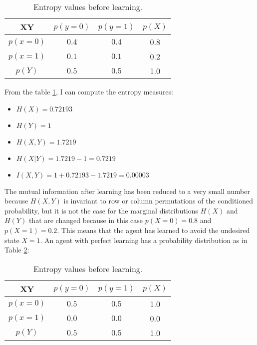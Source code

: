 \begin{table}[htbp]
\caption{
Entropy values before learning. \label{table:afterlearning}}
\begin{center}
\begin{tabular}{@{}c|ccc@{}}
\hline
  XY	   & $p(y=0)$ & $p(y=1)$ & $p(X)$\\
\hline
  $p(x=0)$ & $0.4$    & $0.4$    & 0.8\\
  $p(x=1)$ & $0.1$    & $0.1$    & 0.2\\
\hline
  $p(Y)$   & $0.5$    & $0.5$    & 1.0\\
\hline
\end{tabular}
\end{center}
\end{table}

From the table \ref{table:afterlearning}, I can compute the entropy measures:
\begin{itemize}
 \item $H(X)=0.72193$
 \item $H(Y)=1$
 \item $H(X,Y)=1.7219$
 \item $H(X|Y)=1.7219-1=0.7219$
 \item $I(X,Y)=1+0.72193-1.7219=0.00003$
\end{itemize}
The mutual information after learning has been reduced to a very small number because 
$H(X,Y)$ is invariant to row or column permutations of the conditioned probability, 
but it is not the case for the marginal distributions $H(X)$ and $H(Y)$ that are 
changed because in this case $p(X=0)=0.8$ and $p(X=1)=0.2$. This means that the 
agent has learned to avoid the undesired state $X=1$.
An agent with perfect learning has a probability distribution as in Table \ref{table:perfect}:
\begin{table}[htbp]
\caption{
Entropy values before learning.\label{table:perfect}}
\begin{center}
\begin{tabular}{|c| c| c| c|}
\hline
  XY	   & $p(y=0)$ & $p(y=1)$ & $p(X)$\\
\hline
  $p(x=0)$ & $0.5$    & $0.5$    & 1.0\\
  $p(x=1)$ & $0.0$    & $0.0$    & 0.0\\
\hline
  $p(Y)$   & $0.5$    & $0.5$    & 1.0\\
\hline
\end{tabular}
\end{center}
\end{table}

